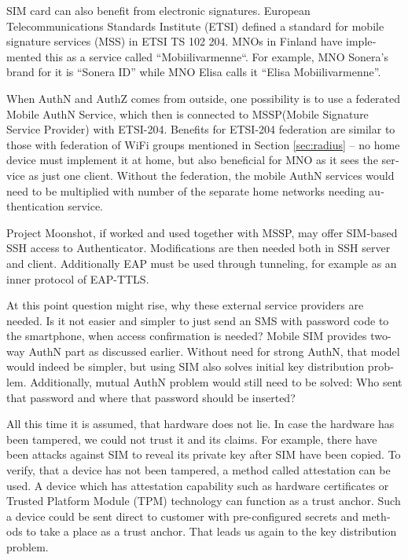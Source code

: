 \documentclass[12pt,a4paper,english]{tutthesis}
\begin{document}
\begin{otherlanguage}{english}
SIM card can also benefit from electronic signatures.
European Telecommunications Standards Institute (ETSI) defined a
standard for mobile signature services (MSS) in ETSI TS 102 204.
MNOs in Finland have implemented this as a 
service called ``Mobiilivarmenne``. 
For example, MNO Sonera's brand for  it is ``Sonera ID'' while MNO Elisa calls it
``Elisa Mobiilivarmenne''.

When AuthN and AuthZ comes from outside, one possibility is to use a
federated Mobile AuthN Service, which then is connected to  MSSP(Mobile
Signature Service Provider) with ETSI-204. Benefits for ETSI-204
federation are similar to those with federation of WiFi groups
mentioned in Section \ref{sec:radius} -- no home device must implement it at home,
but also beneficial for  MNO as it sees the service as just one
client.  Without the federation, the mobile AuthN services would need to be
multiplied with number of the separate home networks  needing authentication service.



Project Moonshot\cite{moonshot}, if worked and used together with MSSP, may offer
SIM-based SSH access to Authenticator. Modifications are then needed 
both in SSH server and client. Additionally EAP must be used through
tunneling, for example as an inner protocol of EAP-TTLS.

At this point question might rise, why these external service
providers are needed. Is it not easier and simpler to just send 
an SMS with password code to the smartphone, when access confirmation is needed?
Mobile SIM provides two-way AuthN part as discussed earlier.
Without need for strong AuthN, that model would indeed be 
simpler, but using SIM also solves initial key distribution problem.
Additionally, mutual AuthN problem would still need to be solved:
Who sent that password and where that password should be inserted?



All this time it is assumed, that hardware does not lie. In case
the hardware has been tampered, we could not trust it and its claims.
For example, there have been attacks against SIM to reveal its private
key after SIM have been copied.  To verify, that a device has not been
tampered, a method called attestation can be used.
A device which has attestation capability such as 
hardware certificates or Trusted Platform Module (TPM) technology
can function as a trust anchor.
Such a device could be sent direct to customer with pre-configured
secrets and methods to take a place as a trust anchor. 
That leads us again to the key distribution problem.


\end{otherlanguage}
\end{document}
